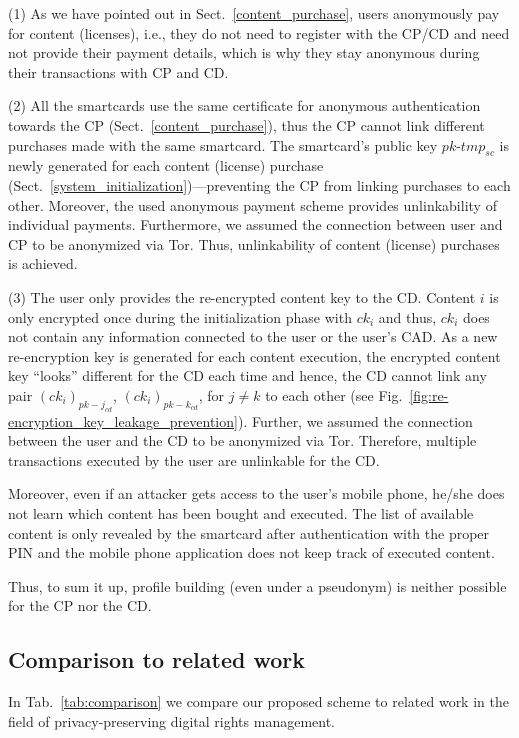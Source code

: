 \documentclass{llncs}
\newcommand{\refSec}[1]{Sect.~\ref{#1}}
\newcommand{\refFig}[1]{Fig.~\ref{#1}}
\newcommand{\refTable}[1]{Tab.~\ref{#1}}
\begin{document}
(1) As we have pointed out in \refSec{content_purchase}, users anonymously pay for content (licenses), i.e., they do not need to register with the CP/CD and need not provide their payment details, which is why they stay anonymous during their transactions with CP and CD.

(2) All the smartcards use the same certificate for anonymous authentication towards the CP (\refSec{content_purchase}), thus the CP cannot link different purchases made with the same smartcard. The smartcard's public key $pk$-$tmp_{sc}$ is newly generated for each content (license) purchase (\refSec{system_initialization})---preventing the CP from linking purchases to each other. Moreover, the used anonymous payment scheme \cite{Tewari1998} provides unlinkability of individual payments. Furthermore, we assumed the connection between user and CP to be anonymized via Tor. Thus, unlinkability of content (license) purchases is achieved. 

(3) The user only provides the re-encrypted content key to the CD. Content $i$ is only encrypted once during the initialization phase with $ck_{i}$ and thus, $ck_{i}$ does not contain any information connected to the user or the user's CAD. As a new re-encryption key is generated for each content execution, the encrypted content key ``looks'' different for the CD each time and hence, the CD cannot link any pair $(ck_i)_{pk-j_{cd}}$, $(ck_i)_{pk-k_{cd}}$, for $j \neq k$ to each other (see \refFig{fig:re-encryption_key_leakage_prevention}). Further, we assumed the connection between the user and the CD to be anonymized via Tor. Therefore, multiple transactions executed by the user are unlinkable for the CD.

Moreover, even if an attacker gets access to the user's mobile phone, he/she does not learn which content has been bought and executed. The list of available content is only revealed by the smartcard after authentication with the proper PIN and the mobile phone application does not keep track of executed content. 

Thus, to sum it up, profile building (even under a pseudonym) is neither possible for the CP nor the CD.

\subsection{Comparison to related work} \label{comparison}


In \refTable{tab:comparison} we compare our proposed scheme to related work in the field of privacy-preserving digital rights management. 
\end{document}
